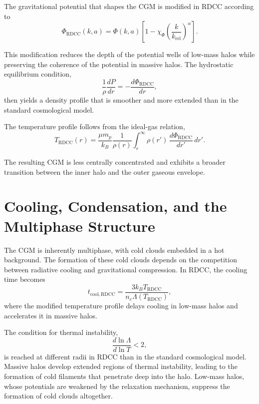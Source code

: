 \documentclass[11pt,a4paper]{article}
\begin{document}
The gravitational potential that shapes the CGM is modified in RDCC according to
\begin{equation}
    \Phi_{\mathrm{RDCC}}(k,a)
    = \Phi(k,a)
      \left[1 - \chi_{\Phi}
      \left(\frac{k}{k_{\mathrm{rel}}}\right)^{\alpha}\right].
\end{equation}

This modification reduces the depth of the potential wells of low-mass halos while 
preserving the coherence of the potential in massive halos. The hydrostatic 
equilibrium condition,
\begin{equation}
    \frac{1}{\rho}\frac{dP}{dr}
    = -\frac{d\Phi_{\mathrm{RDCC}}}{dr},
\end{equation}
then yields a density profile that is smoother and more extended than in the 
standard cosmological model.

The temperature profile follows from the ideal-gas relation,
\begin{equation}
    T_{\mathrm{RDCC}}(r)
    = \frac{\mu m_{p}}{k_{B}}
      \frac{1}{\rho(r)}
      \int_{r}^{\infty}
      \rho(r')\,\frac{d\Phi_{\mathrm{RDCC}}}{dr'}\,dr'.
\end{equation}

The resulting CGM is less centrally concentrated and exhibits a broader transition 
between the inner halo and the outer gaseous envelope.
\section{Cooling, Condensation, and the Multiphase Structure}

The CGM is inherently multiphase, with cold clouds embedded in a hot background. 
The formation of these cold clouds depends on the competition between radiative 
cooling and gravitational compression. In RDCC, the cooling time becomes
\begin{equation}
    t_{\mathrm{cool,RDCC}}
    = \frac{3 k_{B} T_{\mathrm{RDCC}}}{n_{e} \Lambda(T_{\mathrm{RDCC}})},
\end{equation}
where the modified temperature profile delays cooling in low-mass halos and 
accelerates it in massive halos.

The condition for thermal instability,
\begin{equation}
    \frac{d\ln \Lambda}{d\ln T} < 2,
\end{equation}
is reached at different radii in RDCC than in the standard cosmological model. 
Massive halos develop extended regions of thermal instability, leading to the 
formation of cold filaments that penetrate deep into the halo. Low-mass halos, 
whose potentials are weakened by the relaxation mechanism, suppress the formation 
of cold clouds altogether.
\end{document}
